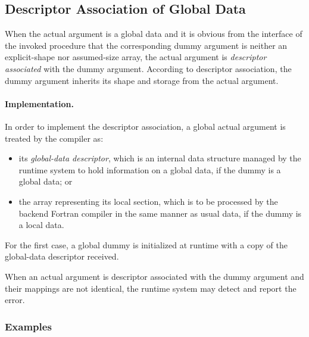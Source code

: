\subsection{Descriptor Association of Global Data}

When the actual argument is a global data and it is obvious from the
interface of the invoked procedure that the corresponding dummy argument
is neither an explicit-shape nor assumed-size array, the actual
argument is {\it descriptor associated} with the dummy
argument. According to descriptor association, the dummy argument 
inherits its shape and storage from the actual argument.

\paragraph{Implementation.}

In order to implement the descriptor association, a global actual
argument is treated by the {\XMP} compiler as:

\begin{itemize}
 \item its {\it global-data descriptor}, which is an internal data
       structure managed by the {\XMP} runtime system to hold
       information on a global data, if the dummy is a global data; or
 \item the array representing its local section, which is to be processed
       by the backend Fortran compiler in the same manner as usual data,
       if the dummy is a local data.
\end{itemize}

For the first case, a global dummy is initialized at runtime with a copy
of the global-data descriptor received.

When an actual argument is descriptor associated with the dummy argument
and their mappings are not identical, the {\XMP} runtime system may
detect and report the error.

\subsubsection*{Examples}

